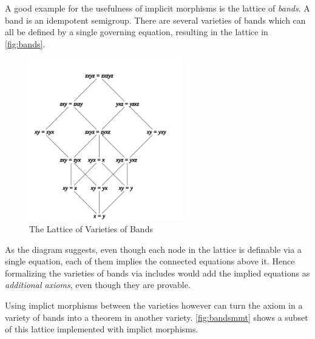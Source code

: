 A good example for the usefulness of implicit morphisms is the lattice of \emph{bands}. A band is an idempotent semigroup. There are several varieties of bands which can all be defined by a single governing equation, resulting in the lattice in \autoref{fig:bands}.

\begin{figure}\begin{center}
\includegraphics[width=0.6\textwidth]{bands}\end{center}
\caption{The Lattice of Varieties of Bands}\label{fig:bands}
\end{figure}

As the diagram suggests, even though each node in the lattice is definable via a single equation, each of them implies the connected equations above it. Hence formalizing the varieties of bands via includes would add the implied equations as \emph{additional axioms}, even though they are provable.

Using implict morphisms between the varieties however can turn the axiom in a variety of bands into a theorem in another variety. \autoref{fig:bandsmmt} shows a subset of this lattice implemented with implict morphisms.

